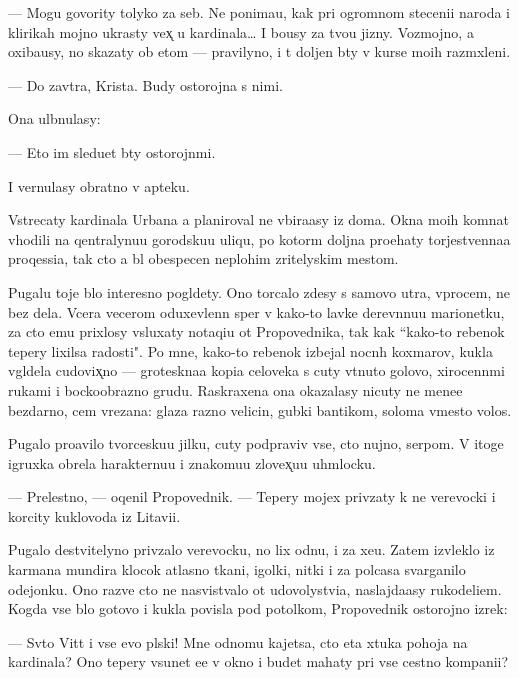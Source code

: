 \documentclass[10pt]{book}
\begin{document}
— Mogu govority tolyko za seb{\ia}. Ne ponima{\y}u, kak pri ogromnom steceni{\y}i naroda i klirikah mojno ukrasty vex̨ u kardinala… I bo{\y}usy za tvo{\y}u jizny. Vozmojno, {\y}a oxiba{\y}usy, no skazaty ob etom — pravilyno, i t{\yi} doljen b{\yi}ty v kurse mo{\y}ih razm{\yi}xleni{\y}.

— Do zavtra, Krista. Budy ostorojna s nimi.

Ona ul{\yi}bnulasy:

— Eto im sledu{\y}et b{\yi}ty ostorojn{\yi}mi.

I vernulasy obratno v apteku.

Vstrecaty kardinala Urbana {\y}a planiroval ne v{\yi}bira{\y}asy iz doma. Okna mo{\y}ih komnat v{\yi}hodili na qentralynu{\y}u gorodsku{\y}u uliqu, po kotor{\yi}m doljna pro{\y}ehaty torjestvenna{\y}a proqessi{\y}a, tak cto {\y}a b{\yi}l obespecen neplohim zritelyskim mestom.

Pugalu toje b{\yi}lo interesno pogl{\ia}dety. Ono torcalo zdesy s samovo utra, vprocem, ne bez dela. Vcera vecerom oduxevlenn{\yi}{\y} sper v kako{\y}-to lavke derev{\ia}nnu{\y}u marionetku, za cto {\y}emu prixlosy v{\yi}sluxaty notaqi{\y}u ot Propovednika, tak kak ``kako{\y}-to rebenok tepery lixilsa radosti". Po mne, kako{\y}-to rebenok izbejal nocn{\yi}h koxmarov, kukla v{\yi}gl{\ia}dela cudovix̨no — groteskna{\y}a kopi{\y}a celoveka s cuty v{\yi}t{\ia}nuto{\y} golovo{\y}, xirocenn{\yi}mi rukami i bockoobrazno{\y} grud{\y}u. Raskraxena ona okazalasy nicuty ne mene{\y}e bezdarno, cem v{\yi}rezana: glaza razno{\y} velicin{\yi}, gubki bantikom, soloma vmesto volos.

Pugalo pro{\y}avilo tvorcesku{\y}u jilku, cuty podpraviv vse, cto nujno, serpom. V itoge igruxka obrela harakternu{\y}u i znakomu{\y}u zlovex̨u{\y}u uhm{\yi}locku.

— Prelestno, — oqenil Propovednik. — Tepery mojex priv{\ia}zaty k ne{\y} verevocki i korcity kuklovoda iz Litavi{\y}i.

Pugalo de{\y}stvitelyno priv{\ia}zalo verevocku, no lix odnu, i za xe{\y}u. Zatem izvleklo iz karmana mundira klocok atlasno{\y} tkani, igolki, nitki i za polcasa svarganilo odejonku. Ono razve cto ne nasvist{\yi}valo ot udovolystvi{\y}a, naslajda{\y}asy rukodeli{\y}em. Kogda vse b{\yi}lo gotovo i kukla povisla pod potolkom, Propovednik ostorojno izrek:

— Sv{\ia}to{\y} Vitt i vse {\y}evo pl{\ia}ski! Mne odnomu kajetsa, cto eta xtuka pohoja na kardinala? Ono tepery v{\yi}sunet {\y}e{\y}e v okno i budet mahaty pri vse{\y} cestno{\y} kompani{\y}i?
\end{document}
